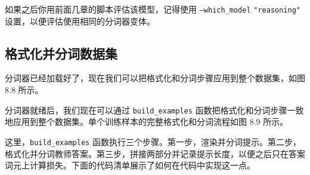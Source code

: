 如果之后你用前面几章的脚本评估该模型，记得使用 \texttt{--which\_model} \texttt{"}\texttt{reasoning}\texttt{"} 设置，以便评估使用相同的分词器变体。

\subsection{格式化并分词数据集}

分词器已经加载好了，现在我们可以把格式化和分词步骤应用到整个数据集，如图 8.8 所示。


分词器就绪后，我们现在可以通过 \texttt{build\_examples} 函数把格式化和分词步骤一致地应用到整个数据集。单个训练样本的完整格式化和分词流程如图 8.9 所示。


这里，\texttt{build\_examples} 函数执行三个步骤。第一步，渲染并分词提示。第二步，格式化并分词教师答案。第三步，拼接两部分并记录提示长度，以便之后只在答案词元上计算损失。下面的代码清单展示了如何在代码中实现这一点。


